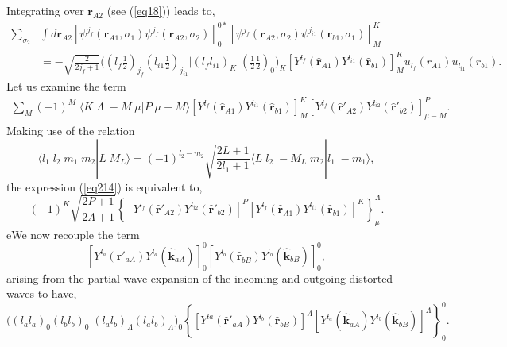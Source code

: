 Integrating over $\mathbf{r}_{A2}$ (see (\ref{eq18})) leads to,
\begin{equation}\label{eq212}
\begin{split}
\sum_{\sigma_2} &\int  d\mathbf{r}_{A2}
\left[ \psi^{j_f} (\mathbf{r}_{A1}, \sigma_1) \psi^{j_f} (\mathbf{r}_{A2}, \sigma_2) \right] _{0}^{0*}
\left[ \psi^{j_f} (\mathbf{r}_{A2}, \sigma_2) \psi^{j_{i1}} (\mathbf{r}_{b1}, \sigma_1) \right]_{M}^{K}\\
&=-\sqrt{\frac{2}{2j_f+1}} \bigl ( (l_f \tfrac{1}{2})_{j_f} (l_{i1} \tfrac{1}{2})_{j_{i1}} |(l_f l_{i1})_K\; (\tfrac{1}{2} \tfrac{1}{2})_0 \bigr )_K \left[ Y^{l_f} (\hat{\mathbf{r}}_{A1}) Y^{l_{i1}} (\hat{\mathbf{r}}_{b1})  \right] ^{K}_{M}u_{l_{f}}(r_{A1})u_{l_{i1}}(r_{b1}).
\end{split}
\end{equation}
Let us examine the term
\begin{equation}\label{eq213}
\begin{split}
\sum_M (-1)^M\;\langle K \;\Lambda\;-M\;\mu|P\;\mu-M\rangle  \left[ Y^{l_f} (\hat{\mathbf{r}}_{A1}) Y^{l_{i1}} (\hat{\mathbf{r}}_{b1})  \right] ^{K}_{M} \left[ Y^{l_f} (\hat{\mathbf{r}}'_{A2}) Y^{l_{i2}} (\hat{\mathbf{r}}'_{b2})  \right] ^{P}_{\mu-M}.
\end{split}
\end{equation}
Making use of the relation
\begin{equation}\label{eq214}
\langle l_1 \;l_2\;m_1\;m_2|L\;M_L\rangle=(-1)^{l_2-m_2}\sqrt{\frac{2L+1}{2l_1+1}}\langle L \;l_2\;-M_L\;m_2|l_1\;-m_1\rangle,
\end{equation}
the expression (\ref{eq214}) is equivalent to,
\begin{equation}\label{eq215}
(-1)^K \sqrt{\frac{2P+1}{2\Lambda+1}}\left\lbrace \left[Y^{l_f} (\hat{\mathbf{r}}'_{A2}) Y^{l_{i2}} (\hat{\mathbf{r}}'_{b2}) \right]^{P}
\left[ Y ^{l_f} (\hat{\mathbf{r}}_{A1}) Y ^{l_{i1}} (\hat{\mathbf{r}}_{b1}) \right]^{K} \right\rbrace ^\Lambda_\mu.
\end{equation}
eWe now recouple the term
\begin{equation}\label{eq216}
\left[ Y ^{l_a} (\hat{\mathbf{r}}'_{aA}) Y ^{l_a} (\hat{\mathbf{k}}_{aA}) \right]^{0}_0 \left[ Y ^{l_b} (\hat{\mathbf{r}}_{bB}) Y ^{l_b} (\hat{\mathbf{k}}_{bB}) \right]^{0}_0,
\end{equation}
 arising from the partial wave expansion of the incoming and outgoing distorted waves to have,
\begin{equation}\label{eq217}
\bigl ((l_a l_a)_0 (l_b l_b)_0 |(l_a l_b)_\Lambda (l_a l_b)_\Lambda \bigr )_0 \left\lbrace \left[Y^{la} (\hat{\mathbf{r}}'_{aA}) Y^{l_{b}} (\hat{\mathbf{r}}_{bB}) \right]^{\Lambda}
\left[ Y ^{l_a} (\hat{\mathbf{k}}_{aA}) Y ^{l_{b}} (\hat{\mathbf{k}}_{bB}) \right]^{\Lambda} \right\rbrace ^0_0.
\end{equation}
